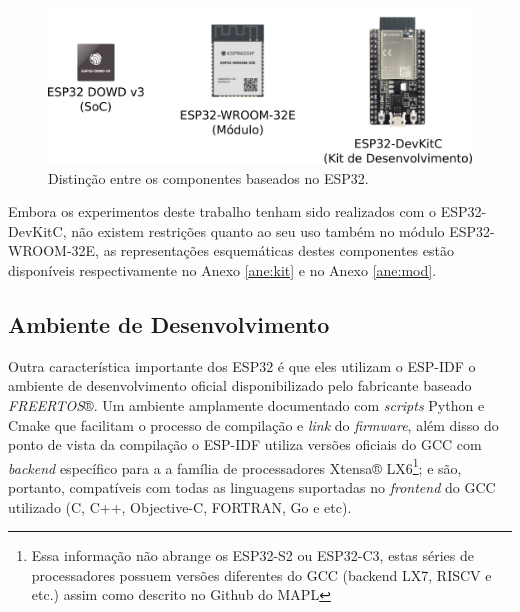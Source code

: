 \begin{figure}[htb]
    \begin{center}
	    \includegraphics[scale=0.5]{figs/esp32-familia.png}
	\end{center}
	\caption{\label{fig:esp-fam} Distinção entre os componentes baseados no ESP32.} 
\end{figure}

Embora os experimentos deste trabalho tenham sido realizados com o ESP32-DevKitC, não existem restrições quanto ao seu uso também no módulo
ESP32-WROOM-32E, as representações esquemáticas destes componentes estão disponíveis respectivamente no Anexo \ref{ane:kit} e no Anexo \ref{ane:mod}.

\subsection{Ambiente de Desenvolvimento}

Outra característica importante dos ESP32 é que eles utilizam o \ac{ESP-IDF} o ambiente de desenvolvimento oficial 
disponibilizado pelo fabricante baseado \textit{FREERTOS}®. Um ambiente amplamente documentado com \textit{scripts} 
Python e Cmake que facilitam o processo de compilação e \textit{link} do \textit{firmware}, além disso do ponto de 
vista da compilação o \ac{ESP-IDF} utiliza versões oficiais do GCC com \textit{backend} específico para a a família de 
processadores Xtensa® LX6\footnote{Essa informação não abrange os ESP32-S2 ou ESP32-C3, estas séries de processadores
possuem versões diferentes do GCC (backend LX7, RISCV e etc.) assim como descrito no Github do \ac{MAPL}\cite{mapl-repo}};
e são, portanto, compatíveis com todas as linguagens suportadas no \textit{frontend} do GCC utilizado (C, C++, Objective-C,
FORTRAN, Go e etc).

